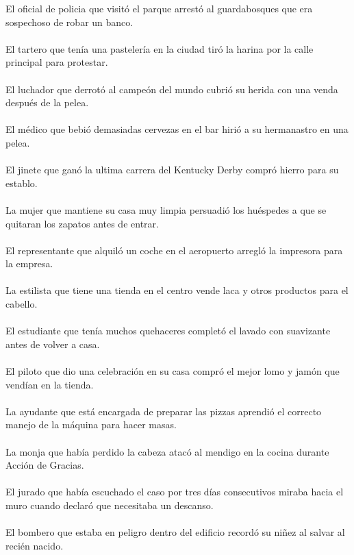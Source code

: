 El oficial de policia que visit\'{o} el parque arrest\'{o} al guardabosques que era sospechoso de robar un banco.	\\	\\
El tartero que ten\'{i}a una pasteler\'{i}a en la ciudad tir\'{o} la harina por la calle principal para protestar.	\\	\\
El luchador que derrot\'{o} al campe\'{o}n del mundo cubri\'{o} su herida con una venda después de la pelea.	\\	\\
El médico que bebi\'{o} demasiadas cervezas en el bar hiri\'{o} a su hermanastro en una pelea.	\\	\\
El jinete que gan\'{o} la ultima carrera del Kentucky Derby compr\'{o} hierro para su establo.	\\	\\
La mujer que mantiene su casa muy limpia persuadi\'{o} los huéspedes a que se quitaran los zapatos antes de entrar.	\\	\\
El representante que alquil\'{o} un coche en el aeropuerto arregl\'{o} la impresora para la empresa.	\\	\\
La estilista que tiene una tienda en el centro vende laca y otros productos para el cabello.	\\	\\
El estudiante que ten\'{i}a muchos quehaceres complet\'{o} el lavado con suavizante antes de volver a casa.	\\	\\
El piloto que dio una celebraci\'{o}n en su casa compr\'{o} el mejor lomo y jam\'{o}n que vend\'{i}an en la tienda.	\\	\\
La ayudante que est\'{a} encargada de preparar las pizzas aprendi\'{o} el correcto manejo de la m\'{a}quina para hacer masas.	\\	\\
La monja que hab\'{i}a perdido la cabeza atac\'{o} al mendigo en la cocina durante Acci\'{o}n de Gracias.	\\	\\
El  jurado que hab\'{i}a escuchado el caso por tres d\'{i}as consecutivos miraba hacia el muro cuando declar\'{o} que necesitaba un descanso.	\\	\\
El bombero que estaba en peligro dentro del edificio record\'{o} su ni\~{n}ez al salvar al recién nacido.	\\	\\
